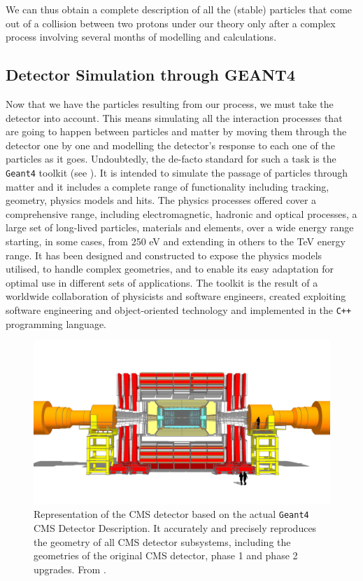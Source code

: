 We can thus obtain a complete description of all the (stable) particles that come out of a collision between two protons under our theory only after a complex process involving several months of modelling and calculations.

\subsection{Detector Simulation through GEANT4}

Now that we have the particles resulting from our process, we must take the detector into account. This means simulating all the interaction processes that are going to happen between particles and matter by moving them through the detector one by one and modelling the detector’s response to each one of the particles as it goes. 
Undoubtedly, the de-facto standard for such a task is the \texttt{Geant4} toolkit (see \cite{AGOSTINELLI2003250}). It is intended to simulate the passage of particles through matter and it includes a complete range of functionality including tracking, geometry, physics models and hits. The physics processes offered cover a comprehensive range, including electromagnetic, hadronic and optical processes, a large set of long-lived particles, materials and elements, over a wide energy range starting, in some cases, from 250 eV and extending in others to the TeV energy range. It has been designed and constructed to expose the physics models utilised, to handle complex geometries, and to enable its easy adaptation for optimal use in different sets of applications. The toolkit is the result of a worldwide collaboration of physicists and software engineers, created exploiting software engineering and object-oriented technology and implemented in the \texttt{C++} programming language.

\begin{figure}
    \centering
     \includegraphics[width=\columnwidth]{gfx/ch2/cms_160518_01_Scene_2.png}
    \caption[CMS model]{ Representation of the CMS detector based on the actual \texttt{Geant4} CMS Detector Description. It accurately and precisely reproduces the geometry of all CMS detector subsystems, including the geometries of the original CMS detector, phase 1 and phase 2 upgrades.  From \cite{decmod}.}
    \label{fig:decmod}
\end{figure}


